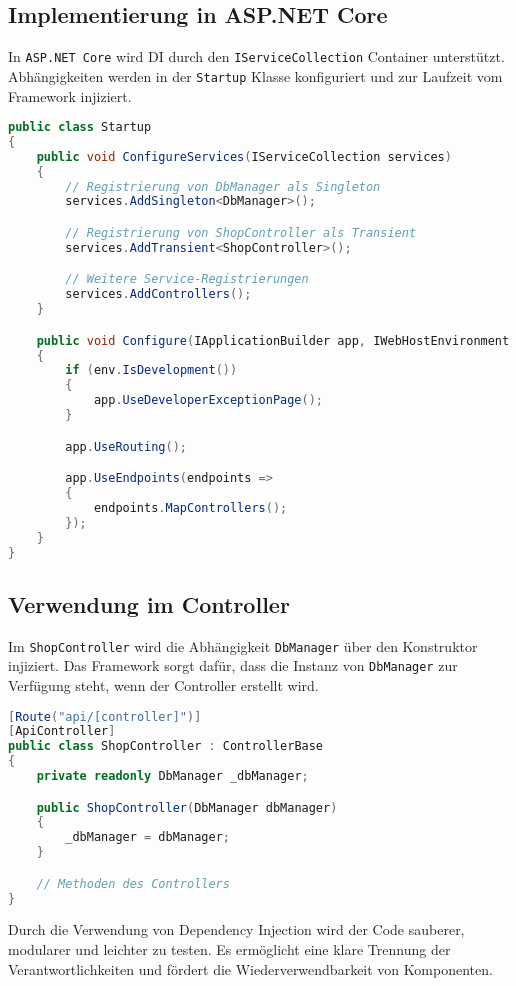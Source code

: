 \documentclass[a4paper,12pt]{report}
\begin{document}
\subsection{Implementierung in ASP.NET Core}
In \texttt{ASP.NET Core} wird DI durch den \texttt{IServiceCollection} Container unterstützt. Abhängigkeiten werden in der \texttt{Startup} Klasse konfiguriert und zur Laufzeit vom Framework injiziert.

\begin{lstlisting}[language=csharp, caption=Beispiel für Dependency Injection in ASP.NET Core]
public class Startup
{
    public void ConfigureServices(IServiceCollection services)
    {
        // Registrierung von DbManager als Singleton
        services.AddSingleton<DbManager>();

        // Registrierung von ShopController als Transient
        services.AddTransient<ShopController>();

        // Weitere Service-Registrierungen
        services.AddControllers();
    }

    public void Configure(IApplicationBuilder app, IWebHostEnvironment env)
    {
        if (env.IsDevelopment())
        {
            app.UseDeveloperExceptionPage();
        }

        app.UseRouting();

        app.UseEndpoints(endpoints =>
        {
            endpoints.MapControllers();
        });
    }
}
\end{lstlisting}

\subsection{Verwendung im Controller}
Im \texttt{ShopController} wird die Abhängigkeit \texttt{DbManager} über den Konstruktor injiziert. Das Framework sorgt dafür, dass die Instanz von \texttt{DbManager} zur Verfügung steht, wenn der Controller erstellt wird.

\begin{lstlisting}[language=csharp, caption=Beispiel für Dependency Injection im Controller]
[Route("api/[controller]")]
[ApiController]
public class ShopController : ControllerBase
{
    private readonly DbManager _dbManager;

    public ShopController(DbManager dbManager)
    {
        _dbManager = dbManager;
    }

    // Methoden des Controllers
}
\end{lstlisting}

Durch die Verwendung von Dependency Injection wird der Code sauberer, modularer und leichter zu testen. Es ermöglicht eine klare Trennung der Verantwortlichkeiten und fördert die Wiederverwendbarkeit von Komponenten.
\end{document}
